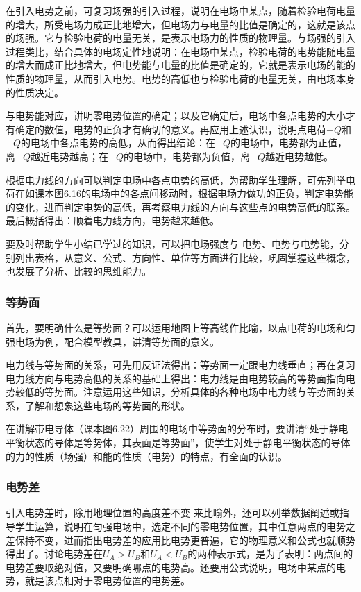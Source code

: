 在引入电势之前，可复习场强的引入过程，说明在电场中某点，随着检验电荷电量的增大，所受电场力成正比地增大，但电场力与电量的比值是确定的，这就是该点的场强。它与检验电荷的电量无关，是表示电场力的性质的物理量。与场强的引入过程类比，结合具体的电场定性地说明：在电场中某点，检验电荷的电势能随电量的增大而成正比地增大，但电势能与电量的比值是确定的，它就是表示电场的能的性质的物理量，从而引入电势。电势的高低也与检验电荷的电量无关，由电场本身的性质决定。

与电势能对应，讲明零电势位置的确定；以及它确定后，电场中各点电势的大小才有确定的数值，电势的正负才有确切的意义。再应用上述认识，说明点电荷$+Q$和$-Q$的电场中各点电势的高低，从而得出结论：在$+Q$的电场中，电势都为正值，离$+Q$越近电势越高；在$-Q$的电场中，电势都为负值，离$-Q$越近电势越低。

根据电力线的方向可以判定电场中各点电势的高低，为帮助学生理解，可先列举电荷在如课本图6.16的电场中的各点间移动时，根据电场力做功的正负，判定电势能的变化，进而判定电势的高低，再考察电力线的方向与这些点的电势高低的联系。最后概括得出：顺着电力线方向，电势越来越低。

要及时帮助学生小结已学过的知识，可以把电场强度与
电势、电势与电势能，分别列出表格，从意义、公式、方向性、单位等方面进行比较，巩固掌握这些概念，也发展了分析、比较的思维能力。

\subsubsection{等势面}

首先，要明确什么是等势面？可以运用地图上等高线作比喻，以点电荷的电场和匀强电场为例，配合模型教具，讲清等势面的意义。

电力线与等势面的关系，可先用反证法得出：等势面一定跟电力线垂直；再在复习电力线方向与电势高低的关系的基础上得出：电力线是由电势较高的等势面指向电势较低的等势面。注意运用这些知识，分析具体的各种电场中电力线与等势面的关系，了解和想象这些电场的等势面的形状。

在讲解带电导体（课本图6.22）周围的电场中等势面的分布时，要讲清“处于静电平衡状态的导体是等势体，其表面是等势面”，使学生对处于静电平衡状态的导体的力的性质（场强）和能的性质（电势）的特点，有全面的认识。

\subsubsection{电势差}

引入电势差时，除用地理位置的高度差不变
来比喻外，还可以列举数据阐述或指导学生运算，说明在匀强电场中，选定不同的零电势位置，其中任意两点的电势之差保持不变，进而指出电势差的应用比电势更普遍，它的物理意义和公式也就顺势得出了。讨论电势差在$U_A>U_B$和$U_A<U_B$的两种表示式，是为了表明：两点间的电势差要取绝对值，又要明确哪点的电势高。还要用公式说明，电场中某点的电势，就是该点相对于零电势位置的电势差。

